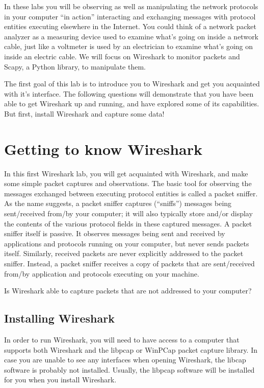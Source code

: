 \documentclass[11pt,a4paper]{article}
\begin{document}
In these labs you will be observing as well as manipulating the network protocols in your computer ``in action'' interacting and exchanging messages with protocol entities executing elsewhere in the Internet. 
You could think of a network packet analyzer as a measuring device used to examine what's going on inside a network cable, just like a voltmeter is used by an electrician to examine what's going on inside an electric cable. We will focus on Wireshark to monitor packets and Scapy, a Python library, to manipulate them. 

The first goal of this lab is to introduce you to Wireshark and get you acquainted with it's interface. The following questions will demonstrate that you have been able to get Wireshark up and running, and have explored some of its capabilities.
But first, install Wireshark and capture some data!

\section{Getting to know Wireshark}
In this first Wireshark lab, you will get acquainted with Wireshark, and make some simple packet captures and observations.
The basic tool for observing the messages exchanged between executing protocol entities is called a packet sniffer. As the name suggests, a packet sniffer captures (``sniffs'') messages being sent/received from/by your computer; it will also typically store and/or display the contents of the various protocol fields in these captured messages. A packet sniffer itself is passive. It observes messages being sent and received by applications and protocols running on your computer, but never sends packets itself. Similarly, received packets are never explicitly addressed to the packet sniffer. Instead, a packet sniffer receives a copy of packets that are sent/received from/by application and protocols executing on your machine.

\begin{question}
    Is Wireshark able to capture packets that are not addressed to your computer?
\end{question}

\subsection{Installing Wireshark}
In order to run Wireshark, you will need to have access to a computer that supports both Wireshark and the libpcap or WinPCap packet capture library. 
In case you are unable to see any interfaces when opening Wireshark, the libcap software is probably not installed. Usually, the libpcap software will be installed for you when you install Wireshark.
\end{document}
